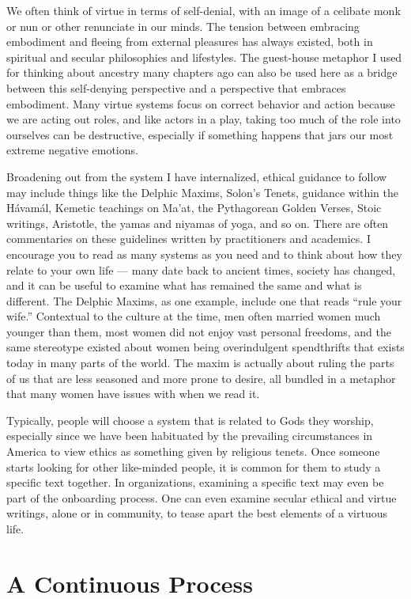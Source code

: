\documentclass[
]{book}
\begin{document}
We often think of virtue in terms of self-denial, with an image of a celibate monk or nun or other renunciate in our minds. The tension between embracing embodiment and fleeing from external pleasures has always existed, both in spiritual and secular philosophies and lifestyles. The guest-house metaphor I used for thinking about ancestry many chapters ago can also be used here as a bridge between this self-denying perspective and a perspective that embraces embodiment. Many virtue systems focus on correct behavior and action because we are acting out roles, and like actors in a play, taking too much of the role into ourselves can be destructive, especially if something happens that jars our most extreme negative emotions.

Broadening out from the system I have internalized, ethical guidance to follow may include things like the Delphic Maxims, Solon's Tenets, guidance within the Hávamál, Kemetic teachings on Ma'at, the Pythagorean Golden Verses, Stoic writings, Aristotle, the yamas and niyamas of yoga, and so on. There are often commentaries on these guidelines written by practitioners and academics. I encourage you to read as many systems as you need and to think about how they relate to your own life --- many date back to ancient times, society has changed, and it can be useful to examine what has remained the same and what is different. The Delphic Maxims, as one example, include one that reads ``rule your wife.'' Contextual to the culture at the time, men often married women much younger than them, most women did not enjoy vast personal freedoms, and the same stereotype existed about women being overindulgent spendthrifts that exists today in many parts of the world. The maxim is actually about ruling the parts of us that are less seasoned and more prone to desire, all bundled in a metaphor that many women have issues with when we read it.

Typically, people will choose a system that is related to Gods they worship, especially since we have been habituated by the prevailing circumstances in America to view ethics as something given by religious tenets. Once someone starts looking for other like-minded people, it is common for them to study a specific text together. In organizations, examining a specific text may even be part of the onboarding process. One can even examine secular ethical and virtue writings, alone or in community, to tease apart the best elements of a virtuous life.

\hypertarget{a-continuous-process}{%
\section{A Continuous Process}\label{a-continuous-process}}
\end{document}
